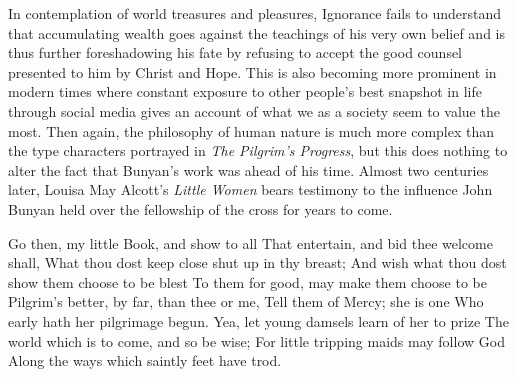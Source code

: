 In contemplation of world treasures and pleasures, Ignorance fails to understand 
that accumulating wealth goes against the teachings of his very own belief and 
is thus further foreshadowing his fate by refusing to accept the good counsel 
presented to him by Christ and Hope. This is also becoming more prominent in 
modern times where constant exposure to other people’s best snapshot in life 
through social media gives an account of what we as a society seem to value the 
most. Then again, the philosophy of human nature is much more complex than the 
type characters portrayed in \emph{The Pilgrim’s Progress}, but this does 
nothing to alter the fact that Bunyan’s work was ahead of his time. Almost two 
centuries later, Louisa May Alcott’s \emph{Little Women} bears testimony to 
the influence John Bunyan held over the fellowship of the cross for years to 
come.

\begin{flushleft}
    \begin{displayquote}
    Go then, my little Book, and show to all                \linebreak
    That entertain, and bid thee welcome shall,             \linebreak
    What thou dost keep close shut up in thy breast;        \linebreak
    And wish what thou dost show them choose to be blest    \linebreak
    To them for good, may make them choose to be            \linebreak
    Pilgrim’s better, by far, than thee or me,              \linebreak
    Tell them of Mercy; she is one                          \linebreak
    Who early hath her pilgrimage begun.                    \linebreak
    Yea, let young damsels learn of her to prize            \linebreak
    The world which is to come, and so be wise;             \linebreak
    For little tripping maids may follow God                \linebreak
    Along the ways which saintly feet have trod.            \linebreak
    \autocite[Preface]{alcott2014}                           
    \end{displayquote}
\end{flushleft}


